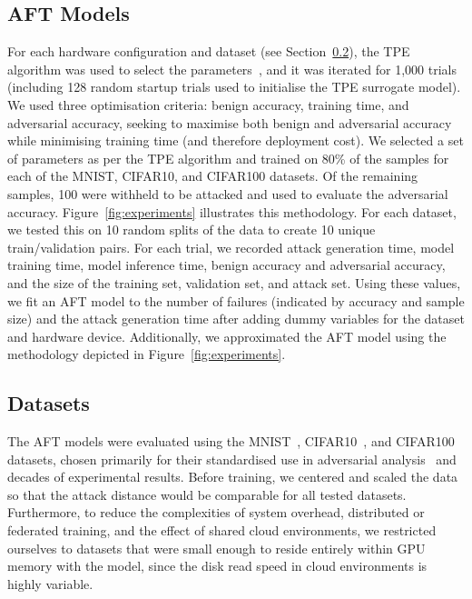 \documentclass[conference]{IEEEtran}%
\begin{document}
\subsection{AFT Models}

For each hardware configuration and dataset (see Section~\ref{datasets}), the TPE algorithm was used to select the parameters~\cite{ozaki2020multiobjective,zitzler2008quality}, and it was iterated for 1,000 trials (including 128 random startup trials used to initialise the TPE surrogate model).
We used three optimisation criteria: benign accuracy, training time, and adversarial accuracy, seeking to maximise both benign and adversarial accuracy while minimising training time (and therefore deployment cost). 
We selected a set of parameters as per the TPE algorithm and trained on 80\% of the samples for each of the MNIST, CIFAR10, and CIFAR100 datasets. Of the remaining samples, 100 were withheld to be attacked and used to evaluate the adversarial accuracy. Figure~\ref{fig:experiments} illustrates this methodology. 
For each dataset, we tested this on 10 random splits of the data to create 10 unique train/validation pairs. For each trial, we recorded attack generation time, model training time, model inference time, benign accuracy and adversarial accuracy, and the size of the training set, validation set, and attack set. 
Using these values, we fit an AFT model to the number of failures (indicated by accuracy and sample size) and the attack generation time after adding dummy variables for the dataset and hardware device. Additionally, we approximated the AFT model using the methodology depicted in Figure~\ref{fig:experiments}.


\subsection{Datasets}
\label{datasets}
The AFT models were evaluated using the MNIST~\cite{mnist}, CIFAR10~\cite{cifar}, and CIFAR100~\cite{cifar} datasets, chosen primarily for their standardised use in adversarial analysis~\cite{madry2017towards,croce_reliable_2020,carlini_towards_2017,deepfool} and decades of experimental results.
Before training, we centered and scaled the data so that the attack distance would be comparable for all tested datasets. Furthermore, to reduce the complexities of system overhead, distributed or federated training, and the effect of shared cloud environments, we restricted ourselves to datasets that were small enough to reside entirely within GPU memory with the model, since the disk read speed in cloud environments is highly variable.
\end{document}
